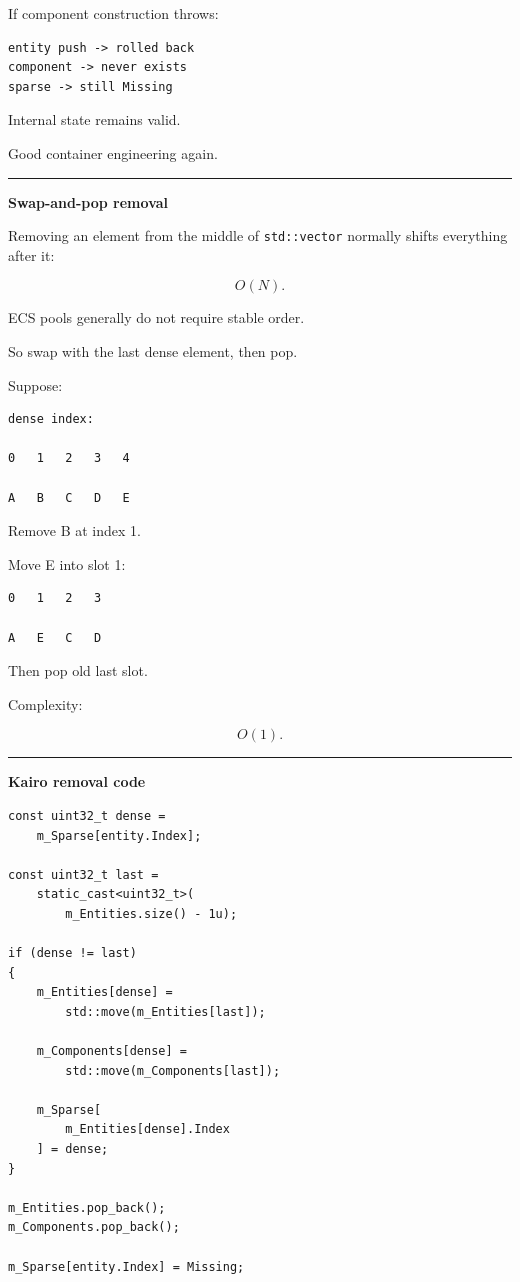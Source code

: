 If component construction throws:

\begin{verbatim}
entity push -> rolled back
component -> never exists
sparse -> still Missing
\end{verbatim}

Internal state remains valid.

Good container engineering again.

\begin{center}\rule{0.5\linewidth}{0.5pt}\end{center}

\textbf{Swap-and-pop removal}

Removing an element from the middle of \texttt{std::vector} normally shifts everything after it:

\[
O(N).
\]

ECS pools generally do not require stable order.

So swap with the last dense element, then pop.

Suppose:

\begin{verbatim}
dense index:

0   1   2   3   4

A   B   C   D   E
\end{verbatim}

Remove B at index 1.

Move E into slot 1:

\begin{verbatim}
0   1   2   3

A   E   C   D
\end{verbatim}

Then pop old last slot.

Complexity:

\[
O(1).
\]

\begin{center}\rule{0.5\linewidth}{0.5pt}\end{center}

\textbf{Kairo removal code}

\begin{verbatim}
const uint32_t dense =
    m_Sparse[entity.Index];

const uint32_t last =
    static_cast<uint32_t>(
        m_Entities.size() - 1u);

if (dense != last)
{
    m_Entities[dense] =
        std::move(m_Entities[last]);

    m_Components[dense] =
        std::move(m_Components[last]);

    m_Sparse[
        m_Entities[dense].Index
    ] = dense;
}

m_Entities.pop_back();
m_Components.pop_back();

m_Sparse[entity.Index] = Missing;
\end{verbatim}

